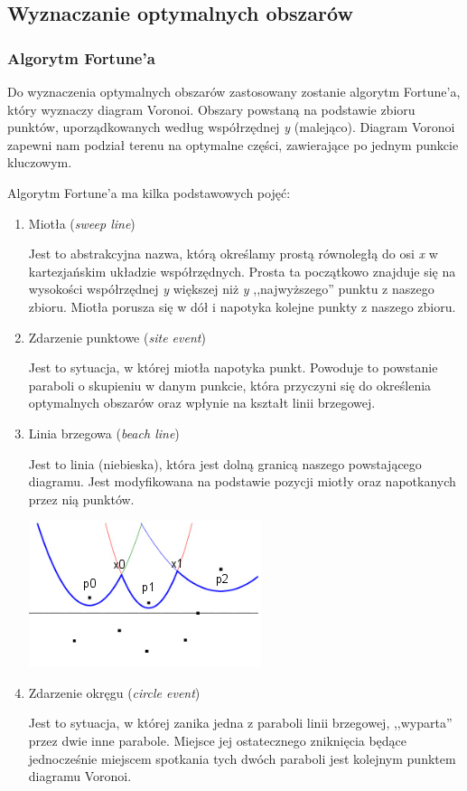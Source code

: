 \documentclass[a4paper,11pt]{article}
\begin{document}
\subsection{Wyznaczanie optymalnych obszarów}
\subsubsection{Algorytm Fortune'a}
Do wyznaczenia optymalnych obszarów zastosowany zostanie algorytm Fortune'a, który wyznaczy diagram Voronoi. Obszary powstaną na podstawie zbioru punktów, uporządkowanych według współrzędnej \textit{y} (malejąco). Diagram Voronoi zapewni nam podział terenu na optymalne części, zawierające po jednym punkcie kluczowym.

\noindent
Algorytm Fortune'a ma kilka podstawowych pojęć:
\begin{enumerate}
\item Miotła (\textit{sweep line})

Jest to abstrakcyjna nazwa, którą określamy prostą równoległą do osi \textit{x} w kartezjańskim układzie współrzędnych. Prosta ta początkowo znajduje się na wysokości współrzędnej \textit{y} większej niż \textit{y} ,,najwyższego'' punktu z naszego zbioru. Miotła porusza się w dół i napotyka kolejne punkty z naszego zbioru.
\item Zdarzenie punktowe (\textit{site event})

Jest to sytuacja, w której miotła napotyka punkt. Powoduje to powstanie paraboli o skupieniu w danym punkcie, która przyczyni się do określenia optymalnych obszarów oraz wpłynie na kształt linii brzegowej.
\item Linia brzegowa (\textit{beach line})

Jest to linia (niebieska), która jest dolną granicą naszego powstającego diagramu. Jest modyfikowana na podstawie pozycji miotły oraz napotkanych przez nią punktów.

\includegraphics[scale=1]{beachline}

\item Zdarzenie okręgu (\textit{circle event})

Jest to sytuacja, w której zanika jedna z paraboli linii brzegowej, ,,wyparta'' przez dwie inne parabole. Miejsce jej ostatecznego zniknięcia będące jednocześnie miejscem spotkania tych dwóch paraboli jest kolejnym punktem diagramu Voronoi.
\end{enumerate}
\end{document}
